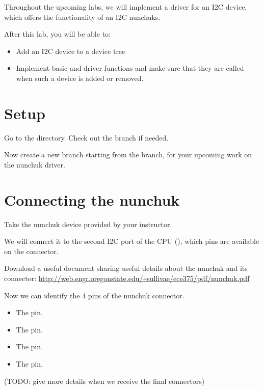 
Throughout the upcoming labs, we will implement a driver for an I2C
device, which offers the functionality of an I2C nunchuks.

After this lab, you will be able to:

\begin{itemize}
\item Add an I2C device to a device tree
\item Implement basic  and  driver
functions and make sure that they are called when such a device is added or removed.
\end{itemize}

\section{Setup}

Go to the  directory. Check out the
 branch if needed. 

Now create a new  branch starting from the
 branch,  for your upcoming work on the nunchuk
driver.  

\section{Connecting the nunchuk}

Take the nunchuk device provided by your instructor.

We will connect it to the second I2C port of the CPU (),
which pins are available on the  connector.

Download a useful document sharing useful details about the nunchuk
and its connector: 
\url{http://web.engr.oregonstate.edu/~sullivae/ece375/pdf/nunchuk.pdf}

Now we can identify the 4 pins of the nunchuk connector.

\begin{itemize}
\item The  pin.
\item The  pin.
\item The  pin.
\item The  pin.
\end{itemize}

(TODO: give more details when we receive the final connectors)

